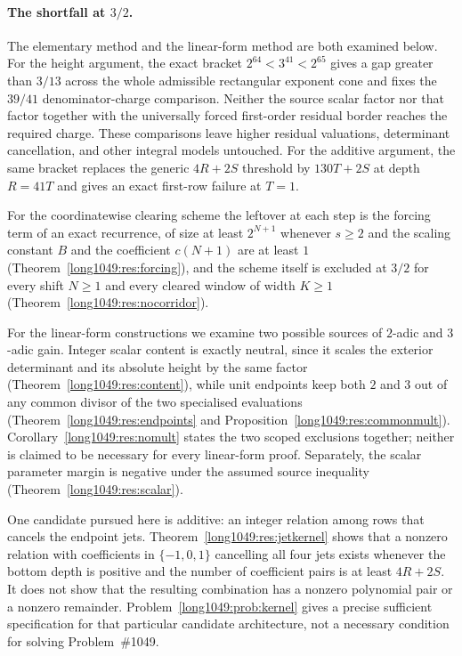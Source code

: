 \paragraph{The shortfall at $3/2$.}
The elementary method and the linear-form method are both examined below.  For
the height argument, the exact bracket $2^{64}<3^{41}<2^{65}$ gives a gap greater
than $3/13$ across the whole admissible rectangular exponent cone and fixes the
$39/41$ denominator-charge comparison.  Neither the source scalar factor nor
that factor together with the universally forced first-order residual border
reaches the required charge.  These comparisons leave higher residual
valuations, determinant cancellation, and other integral models untouched.
For the additive argument, the same bracket replaces the generic
$4R+2S$ threshold by $130T+2S$ at depth $R=41T$ and gives an exact first-row
failure at $T=1$.

For
the coordinatewise clearing scheme the leftover at each step is the forcing
term of an exact recurrence, of size at least
$2^{N+1}$ whenever $s\ge2$ and the scaling constant $B$ and the coefficient
$c(N+1)$ are at least $1$
(Theorem~\ref{long1049:res:forcing}), and the
scheme itself is excluded at $3/2$ for every shift $N\ge1$ and every cleared
window of width $K\ge1$ (Theorem~\ref{long1049:res:nocorridor}).

For the linear-form
constructions we examine two possible sources of $2$-adic and $3$-adic gain.
Integer scalar content is exactly neutral, since it scales the exterior
determinant and its absolute height by the same factor
(Theorem~\ref{long1049:res:content}), while unit endpoints keep both $2$ and $3$ out of
any common divisor of the two specialised evaluations
(Theorem~\ref{long1049:res:endpoints} and Proposition~\ref{long1049:res:commonmult}).
Corollary~\ref{long1049:res:nomult} states the two scoped exclusions together; neither
is claimed to be necessary for every linear-form proof.  Separately, the scalar
parameter margin is negative under the assumed source inequality
(Theorem~\ref{long1049:res:scalar}).

One candidate pursued here is additive: an
integer relation among rows that cancels the endpoint jets.
Theorem~\ref{long1049:res:jetkernel} shows that a nonzero relation with coefficients in
$\{-1,0,1\}$ cancelling all four jets exists whenever the bottom depth is
positive and the number of coefficient pairs is at least $4R+2S$.  It does not
show that the resulting combination has a nonzero polynomial pair or a nonzero
remainder.  Problem~\ref{long1049:prob:kernel} gives a precise sufficient specification
for that particular candidate architecture, not a necessary condition for
solving Problem~\#1049.

